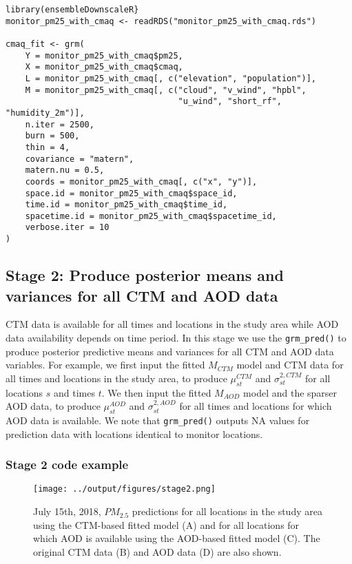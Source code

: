 \documentclass[12pt]{article}
\begin{document}
\begin{lstlisting}
library(ensembleDownscaleR}
monitor_pm25_with_cmaq <- readRDS("monitor_pm25_with_cmaq.rds")

cmaq_fit <- grm(
    Y = monitor_pm25_with_cmaq$pm25,
    X = monitor_pm25_with_cmaq$cmaq,
    L = monitor_pm25_with_cmaq[, c("elevation", "population")],
    M = monitor_pm25_with_cmaq[, c("cloud", "v_wind", "hpbl", 
                                   "u_wind", "short_rf", "humidity_2m")],
    n.iter = 2500,
    burn = 500,
    thin = 4,
    covariance = "matern",
    matern.nu = 0.5,
    coords = monitor_pm25_with_cmaq[, c("x", "y")],
    space.id = monitor_pm25_with_cmaq$space_id,
    time.id = monitor_pm25_with_cmaq$time_id,
    spacetime.id = monitor_pm25_with_cmaq$spacetime_id,
    verbose.iter = 10
)

\end{lstlisting}


\subsection*{Stage 2: Produce posterior means and variances for all CTM and AOD data}
CTM data is available for all times and locations in the study area while AOD data availability depends on time period. 
In this stage we use the \texttt{grm\_pred()} to produce posterior predictive means and variances for all CTM and AOD data variables. 
For example, we first input the fitted $M_{CTM}$ model and CTM data for all times and locations in the study area, to produce $\mu^{CTM}_{st}$ and $\sigma^{2, CTM}_{st}$ for all locations $s$ and times $t$. 
We then input the fitted $M_{AOD}$ model and the sparser AOD data, to produce $\mu^{AOD}_{st}$ and $\sigma^{2, AOD}_{st}$ for all times and locations for which AOD data is available. 
We note that \texttt{grm\_pred()} outputs NA values for prediction data with locations identical to monitor locations. 


\subsubsection*{Stage 2 code example}

\begin{figure}[ht]
    \centering
    \texttt{[image: ../output/figures/stage2.png]}
    \caption{July 15th, 2018,  $PM_{2.5}$ predictions for all locations in the study area using the CTM-based fitted model (A) and for all locations for which AOD is available using the AOD-based fitted model (C). The original CTM data (B) and AOD data (D) are also shown.}
    \label{fig:stage2}
\end{figure}
\end{document}
